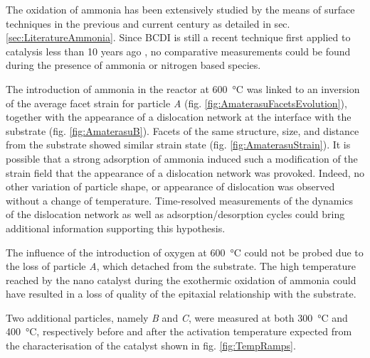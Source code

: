 The oxidation of ammonia has been extensively studied by the means of surface techniques in the previous and current century as detailed in sec. \ref{sec:LiteratureAmmonia}.
Since BCDI is still a recent technique first applied to catalysis less than 10 years ago \parencite{Ulvestad2016}, no comparative measurements could be found during the presence of ammonia or nitrogen based species.

The introduction of ammonia in the reactor at \qty{600}{\degreeCelsius} was linked to an inversion of the average facet strain for particle \textit{A} (fig. \ref{fig:AmaterasuFacetsEvolution}), together with the appearance of a dislocation network at the interface with the substrate (fig. \ref{fig:AmaterasuB}).
Facets of the same structure, size, and distance from the substrate showed similar strain state (fig. \ref{fig:AmaterasuStrain}).
It is possible that a strong adsorption of ammonia induced such a modification of the strain field that the appearance of a dislocation network was provoked.
Indeed, no other variation of particle shape, or appearance of dislocation was observed without a change of temperature.
Time-resolved measurements of the dynamics of the dislocation network as well as adsorption/desorption cycles could bring additional information supporting this hypothesis.

The influence of the introduction of oxygen at \qty{600}{\degreeCelsius} could not be probed due to the loss of particle \textit{A}, which detached from the substrate.
The high temperature reached by the nano catalyst during the exothermic oxidation of ammonia \parencite{Hatscher2008} could have resulted in a loss of quality of the epitaxial relationship with the substrate.

Two additional particles, namely \textit{B} and \textit{C}, were measured at both \qty{300}{\degreeCelsius} and \qty{400}{\degreeCelsius}, respectively before and after the activation temperature expected from the characterisation of the catalyst shown in fig. \ref{fig:TempRamps}.

